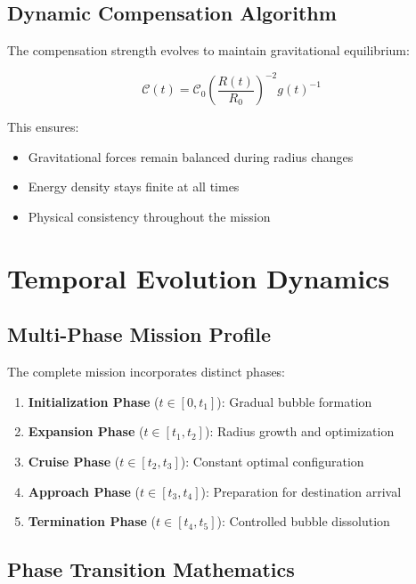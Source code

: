 \documentclass[12pt,a4paper]{article}
\begin{document}
\subsection{Dynamic Compensation Algorithm}

The compensation strength evolves to maintain gravitational equilibrium:

\begin{equation}
\mathcal{C}(t) = \mathcal{C}_0 \left(\frac{R(t)}{R_0}\right)^{-2} g(t)^{-1}
\end{equation}

This ensures:
\begin{itemize}
\item Gravitational forces remain balanced during radius changes
\item Energy density stays finite at all times
\item Physical consistency throughout the mission
\end{itemize}

\section{Temporal Evolution Dynamics}

\subsection{Multi-Phase Mission Profile}

The complete mission incorporates distinct phases:

\begin{enumerate}
\item \textbf{Initialization Phase} ($t \in [0, t_1]$): Gradual bubble formation
\item \textbf{Expansion Phase} ($t \in [t_1, t_2]$): Radius growth and optimization
\item \textbf{Cruise Phase} ($t \in [t_2, t_3]$): Constant optimal configuration
\item \textbf{Approach Phase} ($t \in [t_3, t_4]$): Preparation for destination arrival
\item \textbf{Termination Phase} ($t \in [t_4, t_5]$): Controlled bubble dissolution
\end{enumerate}

\subsection{Phase Transition Mathematics}
\end{document}
